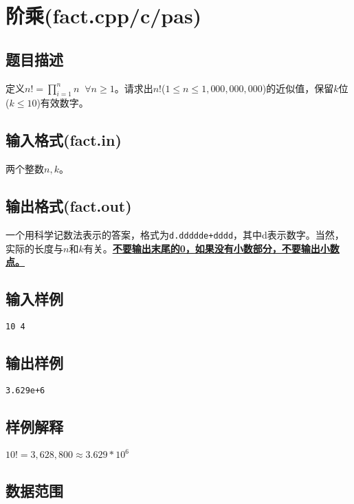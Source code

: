 \documentclass[hyperref,UTF8,12pt,a4paper]{ctexart}
\begin{document}
\newpage

\section{阶乘(fact.cpp/c/pas)}

\subsection{题目描述}

定义$n!=\prod_{i=1}^n n\;\;\forall n\ge1$。请求出$n!$($1\le n\le1,000,000,000$)的近似值，保留$k$位($k\le10$)有效数字。

\subsection{输入格式(fact.in)}

两个整数$n,k$。

\subsection{输出格式(fact.out)}

一个用科学记数法表示的答案，格式为\verb|d.ddddde+dddd|，其中d表示数字。当然，实际的长度与$n$和$k$有关。\underline{\textbf{不要输出末尾的0，如果没有小数部分，不要输出小数点。}}

\subsection{输入样例}

\begin{verbatim}
10 4
\end{verbatim}

\subsection{输出样例}

\begin{verbatim}
3.629e+6
\end{verbatim}

\subsection{样例解释}

$10!=3,628,800\approx3.629*10^6$

\subsection{数据范围}
\end{document}
